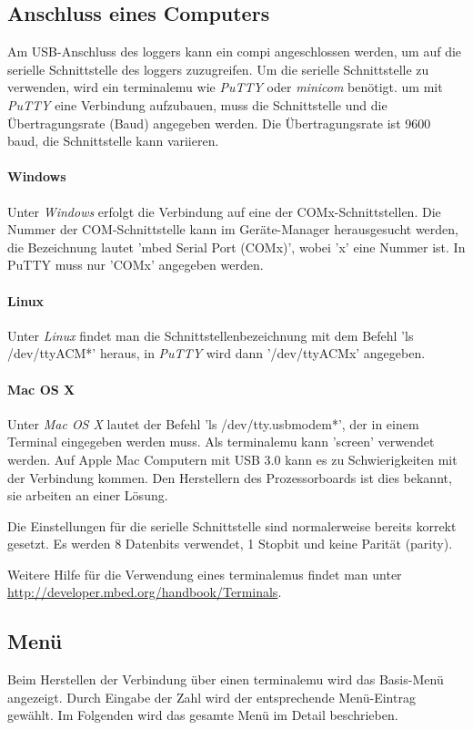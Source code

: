 \subsection{Anschluss eines Computers}
Am USB-Anschluss des \gls{logger}s kann ein \gls{compi} angeschlossen werden, um auf die serielle Schnittstelle des \gls{logger}s zuzugreifen. Um die serielle Schnittstelle zu verwenden, wird ein \gls{terminalemu} wie \emph{PuTTY} oder \emph{minicom} benötigt. um mit \emph{PuTTY} eine Verbindung aufzubauen, muss die Schnittstelle und die Übertragungsrate (Baud) angegeben werden. Die Übertragungsrate ist 9600 baud, die Schnittstelle kann variieren. 

\paragraph{Windows} Unter \emph{Windows} erfolgt die Verbindung auf eine der COMx-Schnittstellen. Die Nummer der COM-Schnittstelle kann im Geräte-Manager herausgesucht werden, die Bezeichnung lautet 'mbed Serial Port (COMx)', wobei 'x' eine Nummer ist. In PuTTY muss nur 'COMx' angegeben werden.

\paragraph{Linux} Unter \emph{Linux} findet man die Schnittstellenbezeichnung mit dem Befehl 'ls /dev/ttyACM*' heraus, in \emph{PuTTY} wird dann '/dev/ttyACMx' angegeben. 

\paragraph{Mac OS X} Unter \emph{Mac OS X} lautet der Befehl 'ls /dev/tty.usbmodem*', der in einem Terminal eingegeben werden muss. Als \gls{terminalemu} kann 'screen' verwendet werden. Auf Apple Mac Computern mit USB 3.0 kann es zu Schwierigkeiten mit der Verbindung kommen. Den Herstellern des Prozessorboards ist dies bekannt, sie arbeiten an einer Lösung.

Die Einstellungen für die serielle Schnittstelle sind normalerweise bereits korrekt gesetzt. Es werden 8 Datenbits verwendet, 1 Stopbit und keine Parität (parity).

Weitere Hilfe für die Verwendung eines \gls{terminalemu}s findet man unter \url{http://developer.mbed.org/handbook/Terminals}.


\subsection{Menü}\label{ssec.menu}
Beim Herstellen der Verbindung über einen \gls{terminalemu} wird das Basis-Menü angezeigt. Durch Eingabe der Zahl wird der entsprechende Menü-Eintrag gewählt. Im Folgenden wird das gesamte Menü im Detail beschrieben.

